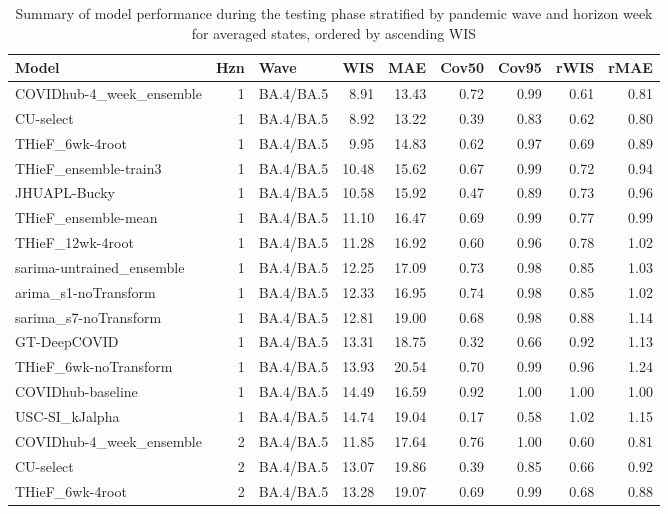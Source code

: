 \documentclass[12pt]{article}
\begin{document}
\begingroup\renewcommand{\arraystretch}{0.75} \setlength{\tabcolsep}{3pt}
\begin{longtable}{lrlrrrrrr}
\caption{Summary of model performance during the testing phase stratified by pandemic wave and horizon week for averaged states, ordered by ascending WIS} \\ 
  \hline
Model & Hzn & Wave & WIS & MAE & Cov50 & Cov95 & rWIS & rMAE \\ 
  \hline
COVIDhub-4\_week\_ensemble & 1 & BA.4/BA.5 & 8.91 & 13.43 & 0.72 & 0.99 & 0.61 & 0.81 \\ 
  CU-select & 1 & BA.4/BA.5 & 8.92 & 13.22 & 0.39 & 0.83 & 0.62 & 0.80 \\ 
  THieF\_6wk-4root & 1 & BA.4/BA.5 & 9.95 & 14.83 & 0.62 & 0.97 & 0.69 & 0.89 \\ 
  THieF\_ensemble-train3 & 1 & BA.4/BA.5 & 10.48 & 15.62 & 0.67 & 0.99 & 0.72 & 0.94 \\ 
  JHUAPL-Bucky & 1 & BA.4/BA.5 & 10.58 & 15.92 & 0.47 & 0.89 & 0.73 & 0.96 \\ 
  THieF\_ensemble-mean & 1 & BA.4/BA.5 & 11.10 & 16.47 & 0.69 & 0.99 & 0.77 & 0.99 \\ 
  THieF\_12wk-4root & 1 & BA.4/BA.5 & 11.28 & 16.92 & 0.60 & 0.96 & 0.78 & 1.02 \\ 
  sarima-untrained\_ensemble & 1 & BA.4/BA.5 & 12.25 & 17.09 & 0.73 & 0.98 & 0.85 & 1.03 \\ 
  arima\_s1-noTransform & 1 & BA.4/BA.5 & 12.33 & 16.95 & 0.74 & 0.98 & 0.85 & 1.02 \\ 
  sarima\_s7-noTransform & 1 & BA.4/BA.5 & 12.81 & 19.00 & 0.68 & 0.98 & 0.88 & 1.14 \\ 
  GT-DeepCOVID & 1 & BA.4/BA.5 & 13.31 & 18.75 & 0.32 & 0.66 & 0.92 & 1.13 \\ 
  THieF\_6wk-noTransform & 1 & BA.4/BA.5 & 13.93 & 20.54 & 0.70 & 0.99 & 0.96 & 1.24 \\ 
  COVIDhub-baseline & 1 & BA.4/BA.5 & 14.49 & 16.59 & 0.92 & 1.00 & 1.00 & 1.00 \\ 
  USC-SI\_kJalpha & 1 & BA.4/BA.5 & 14.74 & 19.04 & 0.17 & 0.58 & 1.02 & 1.15 \\ 
  COVIDhub-4\_week\_ensemble & 2 & BA.4/BA.5 & 11.85 & 17.64 & 0.76 & 1.00 & 0.60 & 0.81 \\ 
  CU-select & 2 & BA.4/BA.5 & 13.07 & 19.86 & 0.39 & 0.85 & 0.66 & 0.92 \\ 
  THieF\_6wk-4root & 2 & BA.4/BA.5 & 13.28 & 19.07 & 0.69 & 0.99 & 0.68 & 0.88 \\ 

\end{longtable}
\end{document}
